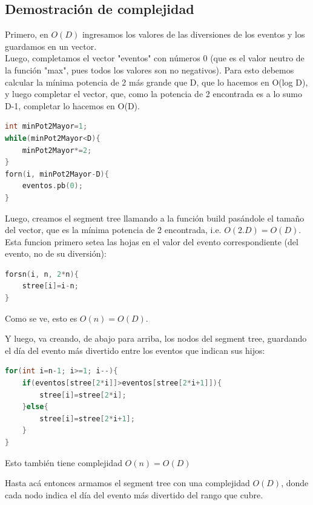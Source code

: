 \documentclass[a4paper]{article}
\begin{document}
\subsection{Demostración de complejidad}

Primero, en $O(D)$ ingresamos los valores de las diversiones de los eventos y los guardamos en un vector.
\\
Luego, completamos el vector "eventos" con números $0$ (que es el valor neutro de la función "max", pues todos los valores son no negativos). Para esto debemos calcular la mínima potencia de 2 más grande que D, que lo hacemos en O(log D), y luego completar el vector, que, como la potencia de 2 encontrada es a lo sumo D-1, completar lo hacemos en O(D).
\\
\begin{lstlisting}[language=c++]
int minPot2Mayor=1;
while(minPot2Mayor<D){
	minPot2Mayor*=2;
}
forn(i, minPot2Mayor-D){
	eventos.pb(0);
}
\end{lstlisting}

Luego, creamos el segment tree llamando a la función build pasándole el tamaño del vector, que es la mínima potencia de 2 encontrada, i.e. $O(2.D) = O(D)$. Esta funcion primero setea las hojas en el valor del evento correspondiente (del evento, no de su diversión):
\begin{lstlisting}[language=c++]
forsn(i, n, 2*n){
	stree[i]=i-n;
}
\end{lstlisting}
Como se ve, esto es $O(n) = O(D)$.

Y luego, va creando, de abajo para arriba, los nodos del segment tree, guardando el día del evento más divertido entre los eventos que indican sus hijos:
\begin{lstlisting}[language=c++]
for(int i=n-1; i>=1; i--){
	if(eventos[stree[2*i]]>eventos[stree[2*i+1]]){
		stree[i]=stree[2*i];
	}else{
		stree[i]=stree[2*i+1];
	}
}
\end{lstlisting}
Esto también tiene complejidad $O(n) = O(D)$

Hasta acá entonces armamos el segment tree con una complejidad $O(D)$, donde cada nodo indica el día del evento más divertido del rango que cubre.\\
\end{document}

